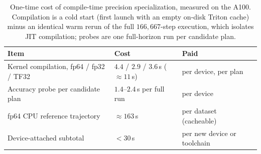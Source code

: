 \begin{table}[!t]
  \centering
  \caption{One-time cost of compile-time precision specialization, measured on the A100. Compilation is a cold start (first launch with an empty on-disk Triton cache) minus an identical warm rerun of the full $166{,}667$-step execution, which isolates JIT compilation; probes are one full-horizon run per candidate plan.}
  \label{tab:overhead-compile}
  \begin{tabular}{@{}L{75pt}R{52pt}L{45pt}@{}}
    \toprule
    Item & Cost & Paid \\
    \midrule
    Kernel compilation, fp64 / fp32 / TF32 & $4.4$ / $2.9$ / $3.6$\,s ($\approx11$\,s) & per device, per plan \\
    Accuracy probe per candidate plan & $1.4$--$2.4$\,s per full run & per device \\
    fp64 CPU reference trajectory & $\approx163$\,s & per dataset (cacheable) \\
    \midrule
    Device-attached subtotal & $<30$\,s & per new device or toolchain \\
    \bottomrule
  \end{tabular}
\end{table}
